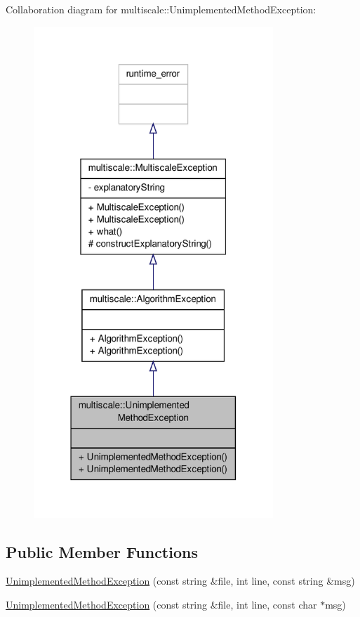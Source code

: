 Collaboration diagram for multiscale\-:\-:Unimplemented\-Method\-Exception\-:\nopagebreak
\begin{figure}[H]
\begin{center}
\leavevmode
\includegraphics[width=256pt]{classmultiscale_1_1UnimplementedMethodException__coll__graph}
\end{center}
\end{figure}
\subsection*{Public Member Functions}
\begin{DoxyCompactItemize}
\item 
\hyperlink{classmultiscale_1_1UnimplementedMethodException_af3e41ba96ee1376dece07e2f875cbc11}{Unimplemented\-Method\-Exception} (const string \&file, int line, const string \&msg)
\item 
\hyperlink{classmultiscale_1_1UnimplementedMethodException_aff17b782e719904081a27badd18740b2}{Unimplemented\-Method\-Exception} (const string \&file, int line, const char $\ast$msg)
\end{DoxyCompactItemize}
